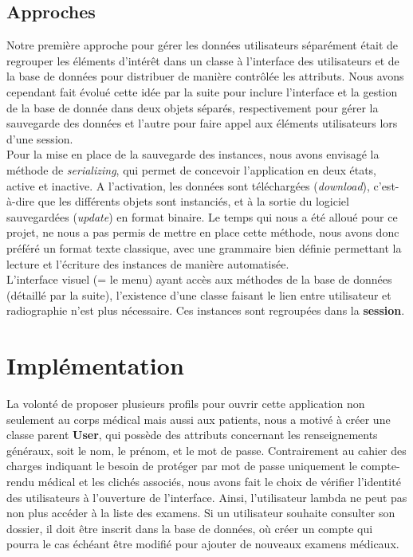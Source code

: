 \documentclass[12pt,a4paper]{article}
\begin{document}
\begin{multicols}{2}
		\subsection{Approches}
		
		Notre première approche pour gérer les données utilisateurs séparément était de regrouper les éléments d'intérêt dans un classe à l'interface des utilisateurs et de la base de données pour distribuer de manière contrôlée les attributs. Nous avons cependant fait évolué cette idée par la suite pour inclure l'interface et la gestion de la base de donnée dans deux objets séparés, respectivement pour gérer la sauvegarde des données et l'autre pour faire appel aux éléments utilisateurs lors d'une session. \\
				
		Pour la mise en place de la sauvegarde des instances, nous avons envisagé la méthode de \textit{serializing}, qui permet de concevoir l'application en deux états, active et inactive. A l'activation, les données sont téléchargées (\textit{download}), c'est-à-dire que les différents objets sont instanciés, et à la sortie du logiciel sauvegardées (\textit{update}) en format binaire. Le temps qui nous a été alloué pour ce projet, ne nous a pas permis de mettre en place cette méthode, nous avons donc préféré un format texte classique, avec une grammaire bien définie permettant la lecture et l'écriture des instances de manière automatisée.\\
				
		L'interface visuel (= le \og menu\fg{}) ayant accès aux méthodes de la base de données (détaillé par la suite), l'existence d'une classe faisant le lien entre utilisateur et radiographie n'est plus nécessaire. Ces instances sont regroupées dans la \textbf{session}.
		
		
		

		\section{Implémentation}
				
		La volonté de proposer plusieurs profils pour ouvrir cette application non seulement au corps médical mais aussi aux patients, nous a motivé à créer une classe parent \textbf{User}, qui possède des attributs concernant les renseignements généraux, soit le nom, le prénom, et le mot de passe. Contrairement au cahier des charges indiquant le besoin de protéger par mot de passe uniquement le compte-rendu médical et les clichés associés, nous avons fait le choix de vérifier l'identité des utilisateurs à l'ouverture de l'interface. Ainsi, l'utilisateur lambda ne peut pas non plus accéder à la liste des examens. Si un utilisateur souhaite consulter son dossier, il doit être inscrit dans la base de données, où créer un compte qui pourra le cas échéant être modifié pour ajouter de nouveaux examens médicaux.\\
		

\end{multicols}
\end{document}
